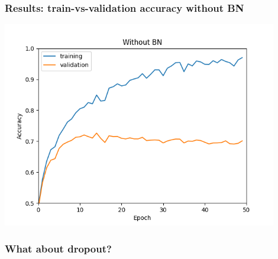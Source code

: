 \documentclass{beamer}
\begin{document}
\begin{frame}
    \frametitle{Results: train-vs-validation accuracy without BN}
    \begin{center}
        \includegraphics[width=0.9\textwidth]{figs/accuracy-t-vs-v-woBN.png}
    \end{center}
\end{frame}

\begin{frame}
    \frametitle{What about dropout?}
\end{frame}
\end{document}
